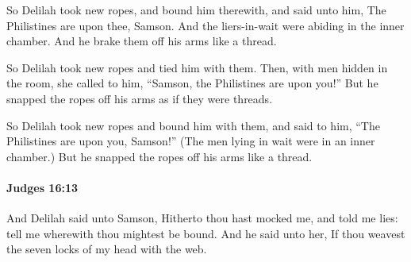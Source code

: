 			\begin{versebox}
					\item[BHS] 
					\item[ASV] So Delilah took new ropes, and bound him therewith, and said unto him, The Philistines are upon thee, Samson. And the liers-in-wait were abiding in the inner chamber. And he brake them off his arms like a thread.
					\item[NIV] So Delilah took new ropes and tied him with them. Then, with men hidden in the room, she called to him, “Samson, the Philistines are upon you!” But he snapped the ropes off his arms as if they were threads.
					\item[NRSV] So Delilah took new ropes and bound him with them, and said to him, “The Philistines are upon you, Samson!” (The men lying in wait were in an inner chamber.) But he snapped the ropes off his arms like a thread.
			\end{versebox}

		\paragraph{Judges 16:13} %
			\label{JUDGES-16-13}

			And Delilah said unto Samson, Hitherto thou hast mocked me, and told me lies: tell me wherewith thou mightest be bound. And he said unto her, If thou weavest the seven locks of my head with the web.

